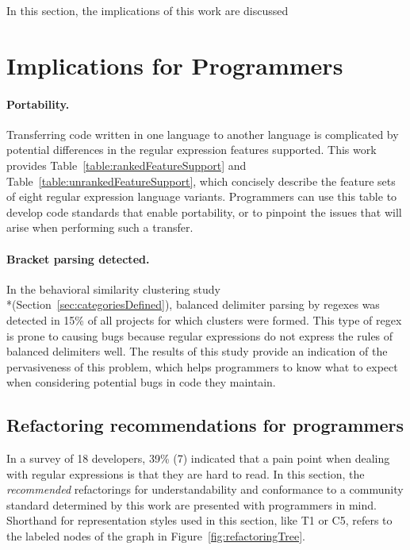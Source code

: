 In this section, the implications of this work are discussed

\section{Implications for Programmers}

\paragraph{Portability.} Transferring code written in one language to another language is complicated by potential differences in the regular expression features supported.  This work provides Table~\ref{table:rankedFeatureSupport} and Table~\ref{table:unrankedFeatureSupport}, which concisely describe the feature sets of eight regular expression language variants.  Programmers can use this table to develop code standards that enable portability, or to pinpoint the issues that will arise when performing such a transfer.

\paragraph{Bracket parsing detected.} In the behavioral similarity clustering study \\*(Section~\ref{sec:categoriesDefined}), balanced delimiter parsing by regexes was detected in 15\% of all projects for which clusters were formed.  This type of regex is prone to causing bugs because regular expressions do not express the rules of balanced delimiters well.  The results of this study provide an indication of the pervasiveness of this problem, which helps programmers to know what to expect when considering potential bugs in code they maintain.

\subsection{Refactoring recommendations for programmers}
In a survey of 18 developers, 39\% (7) indicated that a pain point when dealing with regular expressions is that they are hard to read.  In this section, the \emph{recommended} refactorings for understandability and conformance to a community standard determined by this work are presented with programmers in mind.  Shorthand for representation styles used in this section, like T1 or C5, refers to the labeled nodes of the graph in Figure~\ref{fig:refactoringTree}.

